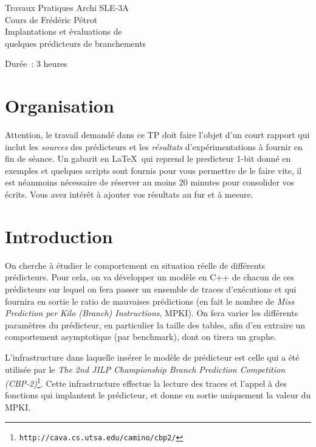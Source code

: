 \documentclass[a4paper]{article}
\begin{document}
\begin{center}
\large
Travaux Pratiques Archi SLE-3A\\
Cours de Frédéric Pétrot\\
\LARGE
Implantations et évaluations de\\
quelques prédicteurs de branchements\\
\large

Durée~: 3 heures
\end{center}
\section{Organisation}
Attention, le travail demandé dans ce TP doit faire l'objet d'un court rapport qui inclut les \emph{sources} des prédicteurs et les \emph{résultats} d'expérimentations à fournir en fin de séance.
Un gabarit en \LaTeX\ qui reprend le predicteur 1-bit donné en exemples et quelques scripts sont fournis pour vous permettre de le faire vite, il est néanmoins nécessaire de réserver au moins 20 minutes pour consolider vos écrits.
Vous avez intérêt à ajouter vos résultats au fur et à mesure.

\section{Introduction}
On cherche à étudier le comportement en situation réelle de différents prédicteurs.
Pour cela, on va développer un modèle en C++ de chacun de ces prédicteurs sur lequel on fera passer un ensemble de traces d'exécutions et qui fournira en sortie le ratio de mauvaises prédictions (en fait le nombre de \emph{Miss Prediction per Kilo (Branch) Instructions}, MPKI).
On fera varier les différents paramètres du prédicteur, en particulier la taille des tables, afin d'en extraire un comportement asymptotique (par benchmark), dont on tirera un graphe.

L'infrastructure dans laquelle insérer le modèle de prédicteur est celle qui a été utilisée par le \emph{The 2nd JILP Championship Branch Prediction Competition (CBP-2)}\footnote{\texttt{http://cava.cs.utsa.edu/camino/cbp2/}}.
Cette infrastructure effectue la lecture des traces et l'appel à des fonctions qui implantent le prédicteur, et donne en sortie uniquement la valeur du MPKI.
\end{document}
